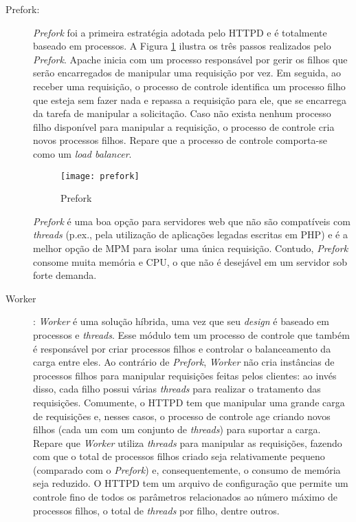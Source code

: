 \begin{description}

	\item[Prefork:]

\emph{Prefork} foi a primeira estratégia adotada pelo HTTPD e é totalmente
baseado em processos. A Figura \ref{fig:prefork} ilustra os três passos
realizados pelo \emph{Prefork}. Apache inicia com um processo responsável
por gerir os filhos que serão encarregados de manipular uma requisição por vez.
Em seguida, ao receber uma requisição, o processo de controle identifica um
processo filho que esteja sem fazer nada e repassa a requisição para ele, que
se encarrega da tarefa de manipular a solicitação. Caso não exista nenhum
processo filho disponível para manipular a requisição, o processo de
controle cria novos processos filhos. Repare que a processo de controle
comporta-se como um \emph{load balancer}.

\begin{figure}[!h]
  \centering
  \texttt{[image: prefork]} 
  \caption{Prefork}
  \label{fig:prefork} 
\end{figure}

\emph{Prefork} é uma boa opção para servidores web que não são compatíveis
com \emph{threads} (p.ex., pela utilização de aplicações legadas escritas em PHP) e é a melhor opção de MPM
para isolar uma única requisição. Contudo, \emph{Prefork} consome muita
memória e CPU, o que não é desejável em um servidor sob forte demanda.

  \item [Worker]: \emph{Worker} é uma solução híbrida, uma vez que seu
\emph{design} é baseado em processos e \emph{threads}. Esse módulo tem um
processo de controle que também é responsável por criar processos filhos e
controlar o balanceamento da carga entre eles.  Ao contrário de \emph{Prefork},
\emph{Worker} não cria instâncias de processos filhos para manipular
requisições feitas pelos clientes: ao invés disso, cada filho possui várias
\emph{threads} para realizar o tratamento das requisições. Comumente, o HTTPD
tem que manipular uma grande carga de requisições e, nesses casos, o processo
de controle age criando novos filhos (cada um com um conjunto de
\emph{threads}) para suportar a carga.  Repare que \emph{Worker} utiliza
\emph{threads} para manipular as requisições, fazendo com que o total de
processos filhos criado seja relativamente pequeno (comparado com o
\emph{Prefork}) e, consequentemente, o consumo de memória seja reduzido. O
HTTPD tem um arquivo de configuração que permite um controle fino de todos os
parâmetros relacionados ao número máximo de processos filhos, o total de
\emph{threads} por filho, dentre outros.


\end{description}
